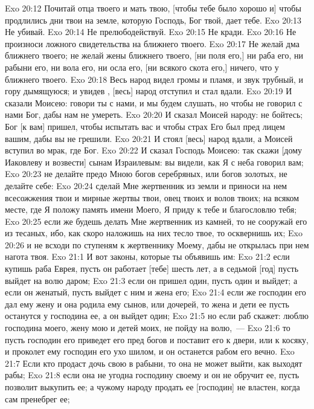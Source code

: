 \rsbpar\vs Exo 20:12 Почитай отца твоего и мать твою, [чтобы тебе было хорошо и] чтобы продлились дни твои на земле, которую Господь, Бог твой, дает тебе.
\rsbpar\vs Exo 20:13 Не убивай.
\rsbpar\vs Exo 20:14 Не прелюбодействуй.
\rsbpar\vs Exo 20:15 Не кради.
\rsbpar\vs Exo 20:16 Не произноси ложного свидетельства на ближнего твоего.
\rsbpar\vs Exo 20:17 Не желай дма ближнего твоего; не желай жены ближнего твоего, [ни поля его,] ни раба его, ни рабыни его, ни вола его, ни осла его, [ни всякого скота его,] ничего, что у ближнего твоего.
\rsbpar\vs Exo 20:18 Весь народ видел громы и пламя, и звук трубный, и гору дымящуюся; и увидев , [весь] народ отступил и стал вдали.
\vs Exo 20:19 И сказали Моисею: говори ты с нами, и мы будем слушать, но чтобы не говорил с нами Бог, дабы нам не умереть.
\vs Exo 20:20 И сказал Моисей народу: не бойтесь; Бог [к вам] пришел, чтобы испытать вас и чтобы страх Его был пред лицем вашим, дабы вы не грешили.
\vs Exo 20:21 И стоял [весь] народ вдали, а Моисей вступил во мрак, где Бог.
\rsbpar\vs Exo 20:22 И сказал Господь Моисею: так скажи [дому Иаковлеву и возвести] сынам Израилевым: вы видели, как Я с неба говорил вам;
\vs Exo 20:23 не делайте предо Мною богов серебряных, или богов золотых, не делайте себе:
\vs Exo 20:24 сделай Мне жертвенник из земли и приноси на нем всесожжения твои и мирные жертвы твои, овец твоих и волов твоих; на всяком месте, где Я положу память имени Моего, Я приду к тебе и благословлю тебя;
\vs Exo 20:25 если же будешь делать Мне жертвенник из камней, то не сооружай его из тесаных, ибо, как скоро наложишь на них тесло твое, то осквернишь их;
\vs Exo 20:26 и не всходи по ступеням к жертвеннику Моему, дабы не открылась при нем нагота твоя.
\vs Exo 21:1 И вот законы, которые ты объявишь им:
\vs Exo 21:2 если купишь раба Еврея, пусть он работает [тебе] шесть лет, а в седьмой [год] пусть выйдет на волю даром;
\vs Exo 21:3 если он пришел один, пусть один и выйдет; а если он женатый, пусть выйдет с ним и жена его;
\vs Exo 21:4 если же господин его дал ему жену и она родила ему сынов, или дочерей, то жена и дети ее пусть останутся у господина ее, а он выйдет один;
\vs Exo 21:5 но если раб скажет: люблю господина моего, жену мою и детей моих, не пойду на волю,~---
\vs Exo 21:6 то пусть господин его приведет его пред богов и поставит его к двери, или к косяку, и проколет ему господин его ухо шилом, и он останется рабом его вечно.
\rsbpar\vs Exo 21:7 Если кто продаст дочь свою в рабыни, то она не может выйти, как выходят рабы;
\vs Exo 21:8 если она не угодна господину своему и он не обручит ее, пусть позволит выкупить ее; а чужому народу продать ее [господин] не властен, когда сам пренебрег ее;
